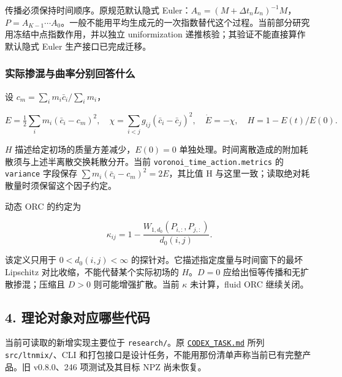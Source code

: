 \documentclass[
  10pt,
  a4paper,
]{article}
\begin{document}
传播必须保持时间顺序。原规范默认隐式
Euler：\(A_n=(M+\Delta t_n L_n)^{-1}M\)，\(P=A_{K-1}\cdots A_0\)。一般不能用平均生成元的一次指数替代这个过程。当前部分研究用冻结中点指数作用，并以独立
uniformization 递推核验；其验证不能直接算作默认隐式 Euler
生产接口已完成迁移。

\subsubsection{实际掺混与曲率分别回答什么}\label{ux5b9eux9645ux63baux6df7ux4e0eux66f2ux7387ux5206ux522bux56deux7b54ux4ec0ux4e48}

设 \(c_m=\sum_i m_i\bar c_i/\sum_i m_i\)，

\[
E=\tfrac12\sum_i m_i(\bar c_i-c_m)^2,\quad
\chi=\sum_{i<j}g_{ij}(\bar c_i-\bar c_j)^2,\quad
\dot E=-\chi,\quad H=1-E(t)/E(0).
\]

\(H\) 描述给定初场的质量方差减少，\(E(0)=0\)
单独处理。时间离散造成的附加耗散须与上述半离散交换耗散分开。当前
\nolinkurl{voronoi_time_action.metrics} 的 \nolinkurl{variance} 字段保存
\(\sum m_i(\bar c_i-c_m)^2=2E\)，其比值 H
与这里一致；读取绝对耗散量时须保留这个因子约定。

动态 ORC 的约定为

\[
\kappa_{ij}=1-\frac{W_{1,d_0}(P_{i,:},P_{j,:})}{d_0(i,j)}.
\]

该定义只用于 \(0<d_0(i,j)<\infty\)
的探针对。它描述指定度量与时间窗下的最坏 Lipschitz
对比收缩，不能代替某个实际初场的 \(H\)。\(D=0\)
应给出恒等传播和无扩散掺混；压缩且 \(D>0\) 则可能增强扩散。当前
\(\kappa\) 未计算，fluid ORC 继续关闭。

\subsection{4.
理论对象对应哪些代码}\label{ux7406ux8bbaux5bf9ux8c61ux5bf9ux5e94ux54eaux4e9bux4ee3ux7801}

当前可读取的新增实现主要位于 \nolinkurl{research/}。原
\href{https://github.com/hongjianli97/diffuse-mixing/blob/main/docs/CODEX_TASK.md}{\nolinkurl{CODEX_TASK.md}}
所列 \nolinkurl{src/ltnmix/}、CLI
和打包接口是设计任务，不能用那份清单声称当前已有完整产品。旧 v0.8.0、246
项测试及其目标 NPZ 尚未恢复。
\end{document}
